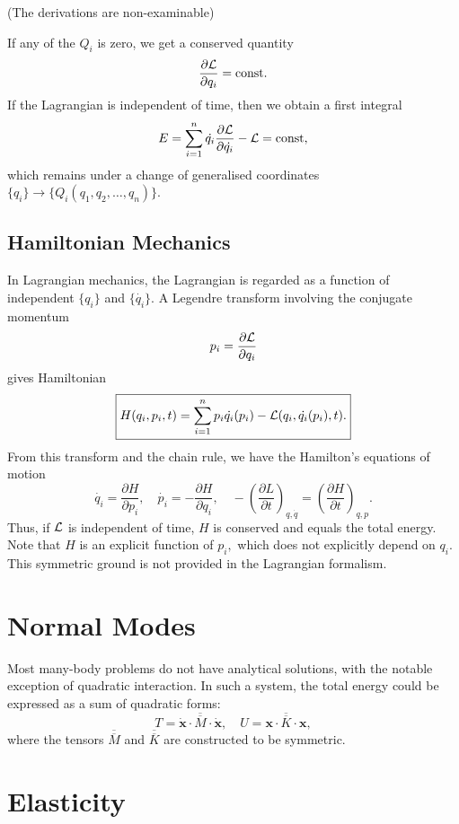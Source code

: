 \documentclass{article}
\begin{document}
(The derivations are non-examinable)

If any of the $Q_i$ is zero, we get a conserved quantity 
\[
    \frac{\partial \mathcal{\MakeUppercase{L}} }{\partial q_i} = \mathrm{const}.  
\]
If the Lagrangian is independent of time, then we obtain a first integral 
\[
    E = \sum_{i=1}^{n} \dot{q_i} \frac{\partial \mathcal{\MakeUppercase{L}} }{\partial \dot{q_i} } - \mathcal{\MakeUppercase{L}}  = \mathrm{const}, 
\]
which remains under a change of generalised coordinates $\{q_i\} \to \{Q_i(q_1, q_2, \ldots , q_n )\}.$
\subsection{Hamiltonian Mechanics}
In Lagrangian mechanics, the Lagrangian is regarded as a function of independent $\{q_i\}$ and $\{\dot{q_i}\}.$ A Legendre transform involving the conjugate momentum 
\[
    p_i = \frac{\partial \mathcal{\MakeUppercase{L}} }{\partial q_i} 
\]
gives Hamiltonian 
\[
    \boxed{ 
        H(q_i, p_i, t) = 
        \sum_{i=1}^{n} p_i \dot{q_i}(p_i) - \mathcal{\MakeUppercase{L}}(q_i, \dot{q_i}(p_i),t ). 
    }
\]
From this transform and the chain rule, we have the Hamilton's equations of motion
\[
    \dot{q_i} = \frac{\partial H}{\partial p_i}, \quad \dot{p_i} = -\frac{\partial H}{\partial q_i}, \quad 
    -\left( \frac{\partial L}{\partial t}   \right)_{q, \dot{q} } = \left(\frac{\partial H}{\partial t}\right)_{q,p}. 
\]
Thus, if $\mathcal{\MakeUppercase{L}} $ is independent of time, $H$ is conserved and equals the total energy. Note that $H$ is an explicit function of $p_i,$ which does not explicitly depend on $q_i.$ This symmetric ground is not provided in the Lagrangian formalism. 

\section{Normal Modes}
Most many-body problems do not have analytical solutions, with the notable exception of quadratic interaction. In such a system, the total energy could be expressed as a sum of quadratic forms:
\[
    T = \dot{\mathbf{x} } \cdot \overline{\overline{M}} \cdot \dot{\mathbf{x} }, \quad 
    U = \mathbf{x} \cdot \overline{\overline{K}} \cdot \mathbf{x}, 
\]
where the tensors $\overline{\overline{M}} $ and $\overline{\overline{K}} $ are constructed to be symmetric. 

\section{Elasticity}
\end{document}
